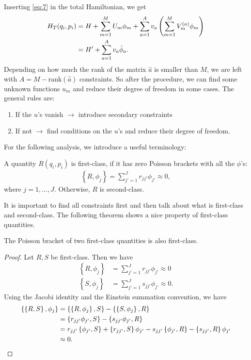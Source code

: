 Inserting \eqref{eq:7} in the total Hamiltonian, we get
\begin{align}\label{eq:8}
H_T(q_i,p_i) &= H + \sum_{m=1}^M U_m \phi_m + \sum_{a=1}^A v_a \left( \sum_{m=1}^M V_m^{(a)} \phi_m \right) \notag \\
&= H' + \sum_{a=1}^A v_a \tilde{\phi}_a.
\end{align}
Depending on how much the rank of the matrix $\hat{a}$ is smaller than $M$, we are left with $A = M - \text{rank} (\hat{a})$ constraints. So after the procedure, we can find some unknown functions $u_m$ and reduce their degree of freedom in some cases. The general rules are:
\begin{enumerate}
\item If the $u$'s vanish $\longrightarrow$ introduce secondary constraints
\item If not $\longrightarrow$ find conditions on the $u$'s and reduce their degree of freedom.
\end{enumerate}


For the following analysis, we introduce a useful terminology:
\begin{definition}
A quantity $R(q_i,p_i)$ is first-class, if it has zero Poisson brackets with all the $\phi$'s:
\begin{align}
\left \{ R,\phi_j \right \} = \sum_{j' = 1}^J r_{j j'} \phi_{j'} \approx 0,
\end{align}
where $j = 1, ... , J$. Otherwise, $R$ is second-class.
\end{definition}
It is important to find all constraints first and then talk about what is first-class and second-class. The following theorem shows a nice property of first-class quantities.

\pagebreak

\begin{theorem}
The Poisson bracket of two first-class quantities is also first-class.
\end{theorem}
\begin{proof}
Let $R,S$ be first-class. Then we have 
\begin{align}
\left \{ R,\phi_j \right \} &= \sum_{j' = 1}^J r_{j j'} \phi_{j'} \approx 0 \\
\left \{ S,\phi_j \right \} &= \sum_{j' = 1}^J s_{j j'} \phi_{j'} \approx 0.
\end{align}
Using the Jacobi identity and the Einstein summation convention, we have
\begin{align}
\left \{ \left \{ R,S \right \},\phi_j \right \} &= \left \{ \left \{ R,\phi_j \right \},S \right \} - \left \{ \left \{ S,\phi_j \right \},R \right \} \notag \\
&= \left \{ r_{j j'} \phi_{j'},S \right \} - \left \{ s_{j j'} \phi_{j'},R \right \} \notag \\
&= r_{j j'} \left \{ \phi_{j'},S \right \} + \left \{ r_{j j'},S \right \} \phi_{j'} - s_{j j'} \left \{ \phi_{j'},R \right \} - \left \{ s_{j j'},R \right \} \phi_{j'} \notag \\
&\approx 0.
\end{align}
\end{proof}

